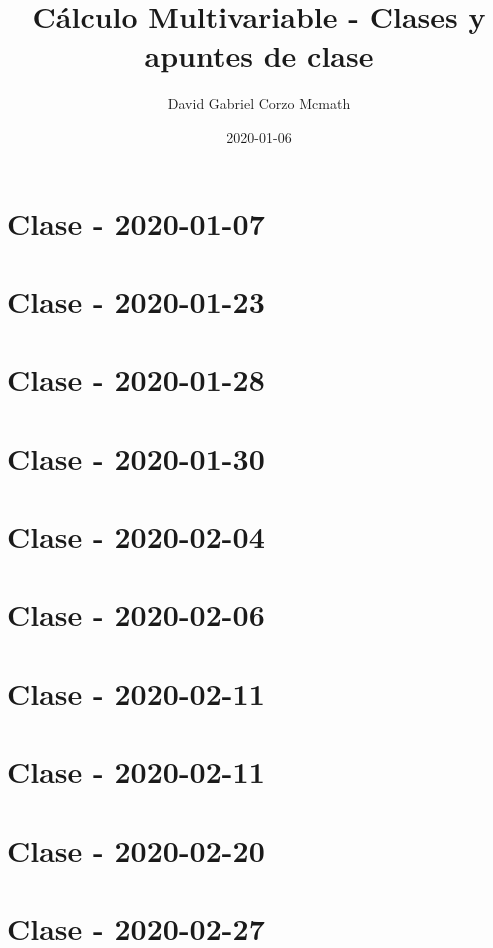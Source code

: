 \documentclass{book}
\title{Cálculo Multivariable - Clases y apuntes de clase}
\date{2020-01-06}
\author{David Gabriel Corzo Mcmath}
\begin{document}
\maketitle
\tableofcontents
\tikzblockdefinitions

\chapter{Clase - 2020-01-07}


\chapter{Clase - 2020-01-23}


\chapter{Clase - 2020-01-28}


\chapter{Clase - 2020-01-30}


\chapter{Clase - 2020-02-04}


\chapter{Clase - 2020-02-06}


\chapter{Clase - 2020-02-11}


\chapter{Clase - 2020-02-11}


\chapter{Clase - 2020-02-20}


\chapter{Clase - 2020-02-27}

\end{document}
